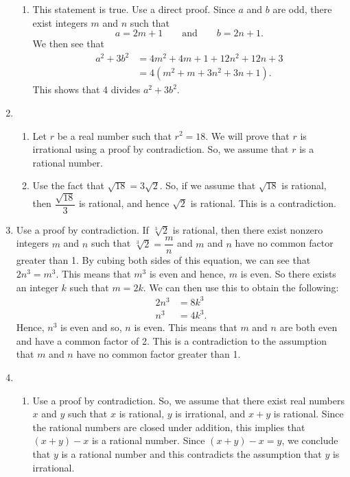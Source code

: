 \begin{enumerate}
\begin{enumerate}
\item This statement is true.  Use a direct proof.  Since $a$ and $b$ are odd, there exist integers $m$ and $n$ such that
\[
a = 2m + 1 \qquad \text{and} \qquad b = 2n + 1.
\]
We then see that
\begin{align*}
a^2 + 3b^2 &= 4m^2 + 4m + 1 + 12n^2 + 12n + 3 \\
           &= 4\left( m^2 + m + 3n^2 + 3n + 1 \right).
\end{align*}
This shows that 4 divides $a^2 + 3b^2$.
\end{enumerate}





\item
\begin{enumerate}
\item Let  $r$  be a real number such that $r^2 = 18$.  We will prove that  $r$  is irrational using a proof by contradiction.  So, we assume that  $r$  is a rational number.

\item  Use the fact that $\sqrt{18} = 3\sqrt{2}$.  So, if we assume that $\sqrt{18}$ is rational, then $\dfrac{\sqrt{18}}{3}$ is rational, and hence $\sqrt{2}$ is rational.  This is a contradiction.
\end{enumerate}


\item Use a proof by contradiction.  If $\sqrt[3]{2}$ is rational, then there exist nonzero integers $m$ and $n$ such that $\sqrt[3]{2} = \dfrac{m}{n}$ and $m$ and $n$ have no common factor greater than 1.  By cubing both sides of this equation, we can see that $2n^3 = m^3$.  This means that $m^3$ is even and hence, $m$ is even.  So there exists an integer $k$ such that 
$m = 2k$.  We can then use this to obtain the following:
\begin{align*}
2n^3 &= 8k^3 \\
 n^3 &= 4k^3.
\end{align*}
Hence, $n^3$ is even and so, $n$ is even.  This means that $m$ and $n$ are both even and have a common factor of 2.  This is a contradiction to the assumption that $m$ and $n$ have no common factor greater than 1.



\item \begin{enumerate}
\item Use a proof by contradiction.  So, we assume that there exist real numbers $x$ and $y$ such that $x$ is rational, $y$ is irrational, and $x + y$ is rational.  Since the rational numbers are closed under addition, this implies that $\left( x + y \right) - x$ is a rational number.  Since $\left( x + y \right) - x = y$, we conclude that $y$ is a rational number and this contradicts the assumption that $y$ is irrational.


\end{enumerate}
\end{enumerate}
